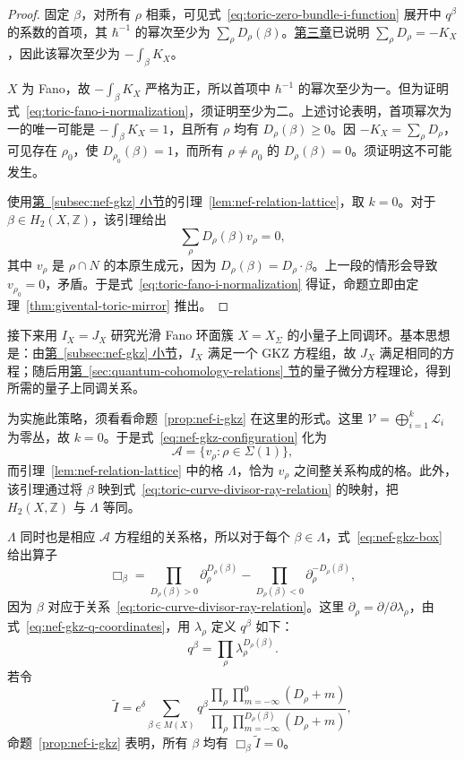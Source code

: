 \begin{example}
\begin{proof}
固定 $\beta$，对所有 $\rho$ 相乘，可见式~\eqref{eq:toric-zero-bundle-i-function} 展开中 $q^\beta$ 的系数的首项，其 $\hbar^{-1}$ 的幂次至少为 $\sum_\rho D_\rho(\beta)$。\hyperref[chap:toric]{第三章}已说明 $\sum_\rho D_\rho=-K_X$，因此该幂次至少为 $-\int_\beta K_X$。

$X$ 为 Fano，故 $-\int_\beta K_X$ 严格为正，所以首项中 $\hbar^{-1}$ 的幂次至少为一。但为证明式~\eqref{eq:toric-fano-i-normalization}，须证明至少为二。上述讨论表明，首项幂次为一的唯一可能是 $-\int_\beta K_X=1$，且所有 $\rho$ 均有 $D_\rho(\beta)\ge0$。因 $-K_X=\sum_\rho D_\rho$，可见存在 $\rho_0$，使 $D_{\rho_0}(\beta)=1$，而所有 $\rho\ne\rho_0$ 的 $D_\rho(\beta)=0$。须证明这不可能发生。

使用\hyperref[subsec:nef-gkz]{第~\ref*{subsec:nef-gkz} 小节}的引理~\ref{lem:nef-relation-lattice}，取 $k=0$。对于 $\beta\in H_2(X,\mathbb Z)$，该引理给出
\begin{equation}\label{eq:toric-curve-divisor-ray-relation}
\sum_\rho D_\rho(\beta)v_\rho=0,
\end{equation}
其中 $v_\rho$ 是 $\rho\cap N$ 的本原生成元，因为 $D_\rho(\beta)=D_\rho\cdot\beta$。上一段的情形会导致 $v_{\rho_0}=0$，矛盾。于是式~\eqref{eq:toric-fano-i-normalization} 得证，命题立即由定理~\ref{thm:givental-toric-mirror} 推出。
\end{proof}
接下来用 $I_X=J_X$ 研究光滑 Fano 环面簇 $X=X_\Sigma$ 的小量子上同调环。基本思想是：由\hyperref[subsec:nef-gkz]{第~\ref*{subsec:nef-gkz} 小节}，$I_X$ 满足一个 GKZ 方程组，故 $J_X$ 满足相同的方程；随后用\hyperref[sec:quantum-cohomology-relations]{第~\ref*{sec:quantum-cohomology-relations} 节}的量子微分方程理论，得到所需的量子上同调关系。

为实施此策略，须看看命题~\ref{prop:nef-i-gkz} 在这里的形式。这里 $\mathcal V=\bigoplus_{i=1}^k\mathcal L_i$ 为零丛，故 $k=0$。于是式~\eqref{eq:nef-gkz-configuration} 化为
\[
\mathcal A=\{v_\rho:\rho\in\Sigma(1)\},
\]
而引理~\ref{lem:nef-relation-lattice} 中的格 $\Lambda$，恰为 $v_\rho$ 之间整关系构成的格。此外，该引理通过将 $\beta$ 映到式~\eqref{eq:toric-curve-divisor-ray-relation} 的映射，把 $H_2(X,\mathbb Z)$ 与 $\Lambda$ 等同。

$\Lambda$ 同时也是相应 $\mathcal A$ 方程组的关系格，所以对于每个 $\beta\in\Lambda$，式~\eqref{eq:nef-gkz-box} 给出算子
\[
\Box_\beta=\prod_{D_\rho(\beta)>0}\partial_\rho^{D_\rho(\beta)}
-\prod_{D_\rho(\beta)<0}\partial_\rho^{-D_\rho(\beta)},
\]
因为 $\beta$ 对应于关系~\eqref{eq:toric-curve-divisor-ray-relation}。这里 $\partial_\rho=\partial/\partial\lambda_\rho$，由式~\eqref{eq:nef-gkz-q-coordinates}，用 $\lambda_\rho$ 定义 $q^\beta$ 如下：
\begin{equation}\label{eq:toric-quantum-monomial-lambda}
q^\beta=\prod_\rho\lambda_\rho^{D_\rho(\beta)}.
\end{equation}
若令
\[
\widetilde I=e^\delta\sum_{\beta\in M(X)}q^\beta
\frac{\prod_\rho\prod_{m=-\infty}^0(D_\rho+m)}{\prod_\rho\prod_{m=-\infty}^{D_\rho(\beta)}(D_\rho+m)},
\]
命题~\ref{prop:nef-i-gkz} 表明，所有 $\beta$ 均有 $\Box_\beta\widetilde I=0$。


\end{example}
